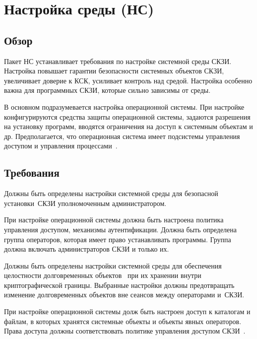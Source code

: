 \section{Настройка среды (НС)}\label{ES}

\subsection{Обзор}\label{ES.Defs}

Пакет НС устанавливает требования по настройке системной среды СКЗИ.
Настройка повышает гарантии безопасности системных объектов СКЗИ,
увеличивает доверие к КСК, усиливает контроль над средой.
%
Настройка особенно важна для программных СКЗИ, которые сильно зависимы от 
среды.

В основном подразумевается настройка операционной системы.
%
При настройке конфигурируются средства защиты операционной системы, 
задаются разрешения на установку программ, 
вводятся ограничения на доступ к системным объектам и др.
%
Предполагается, что операционная система имеет подсистемы управления 
доступом и управления 
процессами~.

\subsection{Требования}\label{ES.Reqs}

\label{R.ES.Install}
Должны быть определены настройки системной среды
для безопасной установки~СКЗИ уполномоченным администратором.

\begin{note}
При настройке операционной системы должна быть настроена политика
управления доступом, механизмы аутентификации. Должна быть определена группа
операторов, которая имеет право устанавливать программы. Группа должна включать
администраторов СКЗИ и только их.
\end{note}

\label{R.ES.Objects}
Должны быть определены настройки системной среды
для обеспечения целостности долговременных объектов~ 
при их хранении внутри криптографической границы. 
%
Выбранные настройки должны предотвращать 
изменение долговременных объектов вне сеансов между операторами и~СКЗИ.

\begin{note}
При настройке операционной системы долж быть настроен
доступ к каталогам и файлам, в которых хранятся системные объекты
и объекты явных операторов. Права доступа должны соответствовать 
политике управления доступом СКЗИ~.
\end{note}

